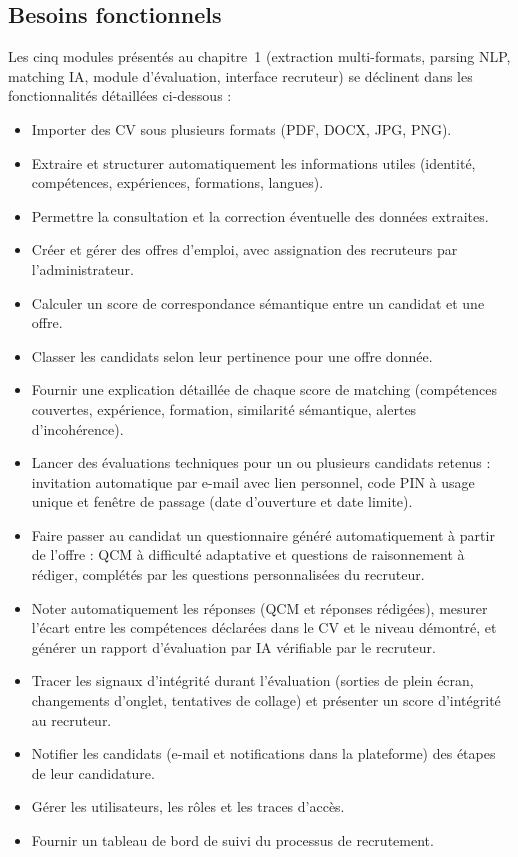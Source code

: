 \documentclass[12pt,a4paper]{report}
\begin{document}
\subsection{Besoins fonctionnels}

Les cinq modules présentés au chapitre~1 (extraction multi-formats, parsing NLP, matching IA, module d'évaluation, interface recruteur) se déclinent dans les fonctionnalités détaillées ci-dessous :

\begin{itemize}
  \item Importer des CV sous plusieurs formats (PDF, DOCX, JPG, PNG).
  \item Extraire et structurer automatiquement les informations utiles (identité, compétences, expériences, formations, langues).
  \item Permettre la consultation et la correction éventuelle des données extraites.
  \item Créer et gérer des offres d'emploi, avec assignation des recruteurs par l'administrateur.
  \item Calculer un score de correspondance sémantique entre un candidat et une offre.
  \item Classer les candidats selon leur pertinence pour une offre donnée.
  \item Fournir une explication détaillée de chaque score de matching (compétences couvertes, expérience, formation, similarité sémantique, alertes d'incohérence).
  \item Lancer des évaluations techniques pour un ou plusieurs candidats retenus : invitation automatique par e-mail avec lien personnel, code PIN à usage unique et fenêtre de passage (date d'ouverture et date limite).
  \item Faire passer au candidat un questionnaire généré automatiquement à partir de l'offre : QCM à difficulté adaptative et questions de raisonnement à rédiger, complétés par les questions personnalisées du recruteur.
  \item Noter automatiquement les réponses (QCM et réponses rédigées), mesurer l'écart entre les compétences déclarées dans le CV et le niveau démontré, et générer un rapport d'évaluation par IA vérifiable par le recruteur.
  \item Tracer les signaux d'intégrité durant l'évaluation (sorties de plein écran, changements d'onglet, tentatives de collage) et présenter un score d'intégrité au recruteur.
  \item Notifier les candidats (e-mail et notifications dans la plateforme) des étapes de leur candidature.
  \item Gérer les utilisateurs, les rôles et les traces d'accès.
  \item Fournir un tableau de bord de suivi du processus de recrutement.
\end{itemize}
\end{document}
